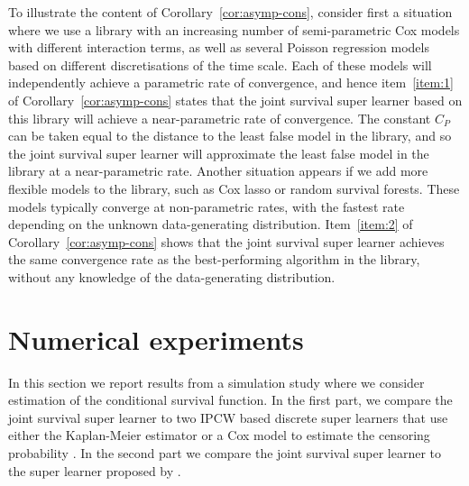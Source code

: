 \documentclass[lineno]{biometrika}
\newcommand{\1}{\mathds{1}}
\begin{document}
To illustrate the content of Corollary~\ref{cor:asymp-cons}, consider
first a situation where we use a library with an increasing number of
semi-parametric Cox models with different interaction terms, as well
as several Poisson regression models based on different
discretisations of the time scale. Each of these models will
independently achieve a parametric rate of convergence, and hence
item~\ref{item:1} of Corollary~\ref{cor:asymp-cons} states that the
joint survival super learner based on this library will achieve a
near-parametric rate of convergence. The constant \( C_P \) can be
taken equal to the distance to the least false model in the library,
and so the joint survival super learner will approximate the least
false model in the library at a near-parametric rate. Another
situation appears if we add more flexible models to the library, such
as Cox lasso or random survival forests. These models typically
converge at non-parametric rates, with the fastest rate depending on
the unknown data-generating distribution. Item~\ref{item:2} of
Corollary~\ref{cor:asymp-cons} shows that the joint survival super
learner achieves the same convergence rate as the best-performing
algorithm in the library, without any knowledge of the data-generating
distribution.

\section{Numerical experiments}
\label{sec:numer-exper}


In this section we report results from a simulation study where we consider
estimation of the conditional survival function. In the first part, we compare
the joint survival super learner to two IPCW based discrete super learners that use either the
Kaplan-Meier estimator or a Cox model to estimate the censoring probability
\citep{gonzalez2021stacked}. In the second part we compare the joint survival super learner to
the super learner proposed by \cite{westling2021inference}.
\end{document}
